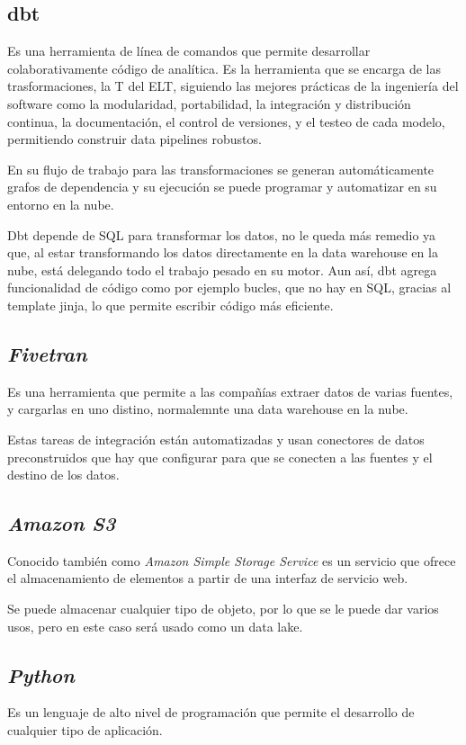 \subsection{dbt}
\cite{dbt} Es una herramienta de línea de comandos que permite desarrollar colaborativamente código de analítica. Es la herramienta que se encarga de las trasformaciones, la T del ELT, siguiendo las mejores prácticas de la ingeniería del software como la modularidad, portabilidad, la integración y distribución continua, la documentación, el control de versiones, y el testeo de cada modelo, permitiendo construir data pipelines robustos.

En su flujo de trabajo para las transformaciones se generan automáticamente grafos de dependencia y su ejecución se puede programar y automatizar en su entorno en la nube.

Dbt depende de SQL para transformar los datos, no le queda más remedio ya que, al estar transformando los datos directamente en la data warehouse en la nube, está delegando todo el trabajo pesado en su motor. Aun así, dbt agrega funcionalidad de código como por ejemplo bucles, que no hay en SQL, gracias al template jinja, lo que permite escribir código más eficiente.

\subsection{\emph{Fivetran}}
\cite{Fivetran} Es una herramienta que permite a las compañías extraer datos de varias fuentes, y cargarlas en uno distino, normalemnte una data warehouse en la nube. 

Estas tareas de integración están automatizadas y usan conectores de datos preconstruidos que hay que configurar para que se conecten a las fuentes y el destino de los datos.

\subsection{\emph{Amazon S3}}
\cite{Amazon} Conocido también como \emph{Amazon Simple Storage Service} es un servicio que ofrece el almacenamiento de elementos a partir de una interfaz de servicio web.

Se puede almacenar cualquier tipo de objeto, por lo que se le puede dar varios usos, pero en este caso será usado como un data lake.

\subsection{\emph{Python}}
\cite{Python} Es un lenguaje de alto nivel de programación que permite el desarrollo de cualquier tipo de aplicación.

